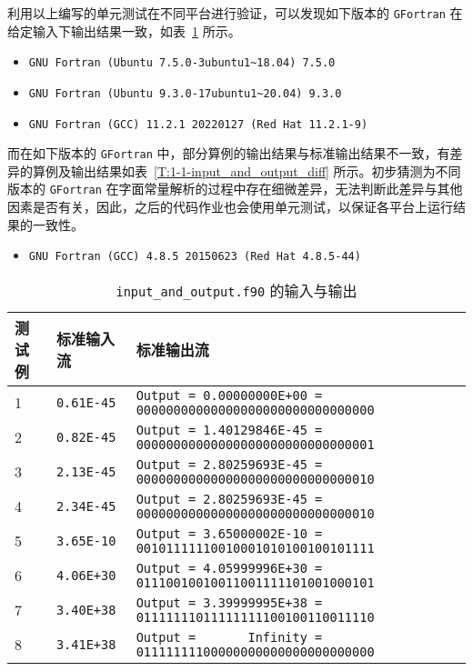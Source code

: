 利用以上编写的单元测试在不同平台进行验证，可以发现如下版本的 \texttt{GFortran} 在给定输入下输出结果一致，如表~\ref{T:1-1-input_and_output} 所示。

\begin{itemize}
    \item \verb|GNU Fortran (Ubuntu 7.5.0-3ubuntu1~18.04) 7.5.0|
    \item \verb|GNU Fortran (Ubuntu 9.3.0-17ubuntu1~20.04) 9.3.0|
    \item \verb|GNU Fortran (GCC) 11.2.1 20220127 (Red Hat 11.2.1-9)|
\end{itemize}

而在如下版本的 \texttt{GFortran} 中，部分算例的输出结果与标准输出结果不一致，有差异的算例及输出结果如表~\ref{T:1-1-input_and_output_diff} 所示。初步猜测为不同版本的 \texttt{GFortran} 在字面常量解析的过程中存在细微差异，无法判断此差异与其他因素是否有关，因此，之后的代码作业也会使用单元测试，以保证各平台上运行结果的一致性。

\begin{itemize}
    \item \verb|GNU Fortran (GCC) 4.8.5 20150623 (Red Hat 4.8.5-44)|
\end{itemize}

\begin{table}[H]
    \caption{\texttt{input\_and\_output.f90} 的输入与输出}\label{T:1-1-input_and_output}
    \centering
    \begin{tabular}{lll}
        \toprule
        测试例 & 标准输入流 & 标准输出流 \\ \midrule
        \rowcolor[HTML]{EFEFEF}
        1 & \verb|0.61E-45| & \verb|Output = 0.00000000E+00 = 00000000000000000000000000000000| \\
        2 & \verb|0.82E-45| & \verb|Output = 1.40129846E-45 = 00000000000000000000000000000001| \\
        \rowcolor[HTML]{EFEFEF}
        3 & \verb|2.13E-45| & \verb|Output = 2.80259693E-45 = 00000000000000000000000000000010| \\
        4 & \verb|2.34E-45| & \verb|Output = 2.80259693E-45 = 00000000000000000000000000000010| \\
        \rowcolor[HTML]{EFEFEF}
        5 & \verb|3.65E-10| & \verb|Output = 3.65000002E-10 = 00101111110010001010100100101111| \\
        6 & \verb|4.06E+30| & \verb|Output = 4.05999996E+30 = 01110010010011001111101001000101| \\
        \rowcolor[HTML]{EFEFEF}
        7 & \verb|3.40E+38| & \verb|Output = 3.39999995E+38 = 01111111011111111100100110011110| \\
        8 & \verb|3.41E+38| & \verb|Output =       Infinity = 01111111100000000000000000000000| \\ \bottomrule
    \end{tabular}
\end{table}

